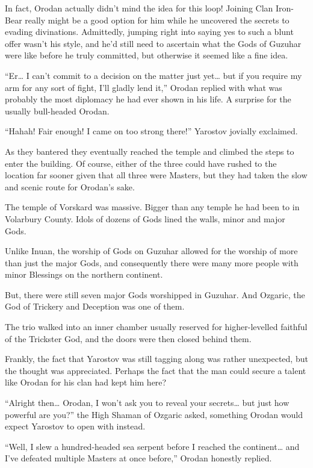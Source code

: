 \documentclass[a4paper,10pt]{book}
\begin{document}
In fact, Orodan actually didn’t mind the idea for this loop! Joining Clan Iron-Bear really might be a good option for him while he uncovered the secrets to evading divinations. Admittedly, jumping right into saying yes to such a blunt offer wasn’t his style, and he’d still need to ascertain what the Gods of Guzuhar were like before he truly committed, but otherwise it seemed like a fine idea.\par
“Er… I can’t commit to a decision on the matter just yet… but if you require my arm for any sort of fight, I’ll gladly lend it,” Orodan replied with what was probably the most diplomacy he had ever shown in his life. A surprise for the usually bull-headed Orodan.\par
“Hahah! Fair enough! I came on too strong there!” Yarostov jovially exclaimed.\par
As they bantered they eventually reached the temple and climbed the steps to enter the building. Of course, either of the three could have rushed to the location far sooner given that all three were Masters, but they had taken the slow and scenic route for Orodan’s sake.\par
The temple of Vorskard was massive. Bigger than any temple he had been to in Volarbury County. Idols of dozens of Gods lined the walls, minor and major Gods.\par
Unlike Inuan, the worship of Gods on Guzuhar allowed for the worship of more than just the major Gods, and consequently there were many more people with minor Blessings on the northern continent.\par
But, there were still seven major Gods worshipped in Guzuhar. And Ozgaric, the God of Trickery and Deception was one of them.\par
The trio walked into an inner chamber usually reserved for higher-levelled faithful of the Trickster God, and the doors were then closed behind them.\par
Frankly, the fact that Yarostov was still tagging along was rather unexpected, but the thought was appreciated. Perhaps the fact that the man could secure a talent like Orodan for his clan had kept him here?\par
“Alright then… Orodan, I won’t ask you to reveal your secrets… but just how powerful are you?” the High Shaman of Ozgaric asked, something Orodan would expect Yarostov to open with instead.\par
“Well, I slew a hundred-headed sea serpent before I reached the continent… and I’ve defeated multiple Masters at once before,” Orodan honestly replied.\par
\end{document}
